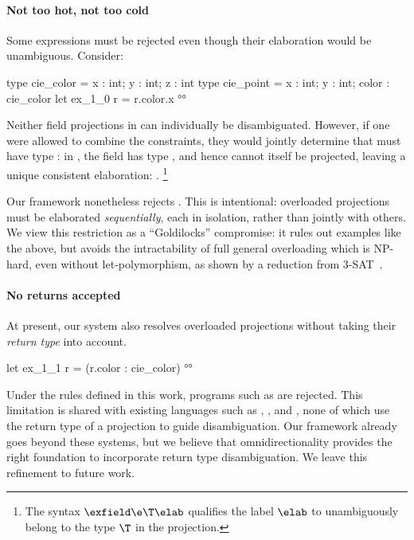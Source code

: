 \documentclass[acmsmall,screen,nonacm%
\Anonymous{,anonymous}{}%
\Final{}{,review}%
]{acmart}
\providecommand{\DIFaddbegin}{} %
\providecommand{\DIFaddend}{} %
\providecommand{\DIFdelbegin}{} %
\providecommand{\DIFdelend}{} %
\begin{document}
\paragraph{Not too hot, not too cold} Some expressions
must be rejected even though their elaboration would be unambiguous. Consider:
\DIFdelbegin %

\DIFdelend \begin{program}
type cie_color = { x : int; y : int; z : int }
type cie_point = { x : int; y : int; color : cie_color }
let ex_1_0 r = r.color.x °°
\end{program}
Neither field projections in  can individually be
disambiguated. However, if one were allowed to combine the constraints, they
would jointly determine that  must have type : in
, the field  has type , and hence
cannot itself be projected, leaving a unique consistent elaboration:
.%
%
\footnote{
The syntax $\exfield \e \T \elab$ qualifies the label $\elab$ to unambiguously
belong to the type $\T$ in the projection.
}

Our framework nonetheless rejects . This is intentional:
overloaded projections must be elaborated \emph{sequentially}, each in isolation,
rather than jointly with others. We view this restriction as a
``Goldilocks'' compromise: it rules out examples like the above, but avoids
the intractability of full general overloading which is NP-hard, even
without let-polymorphism, as shown by a reduction from 3-SAT~\citep*
{Chargueraud-Bodin-Dunfield-Riboulet/jfla2025}.

\paragraph{No returns accepted}
At present, our system also resolves overloaded projections without taking their
\emph{return type} into account.
%
\DIFdelbegin %
\DIFdelend \DIFaddbegin \begin{program}
let ex_1_1 r = (r.color : cie_color) °°
\end{program}
\DIFaddend %
Under the rules defined in this work, programs such as  are
rejected. This limitation is shared with existing languages such as \OCaml,
\Haskell, and \SML, none of which use the return type of a projection to guide
disambiguation. Our framework already goes beyond these systems, but we believe
that omnidirectionality provides the right foundation to incorporate return
type disambiguation. We leave this refinement to future work.
\end{document}
